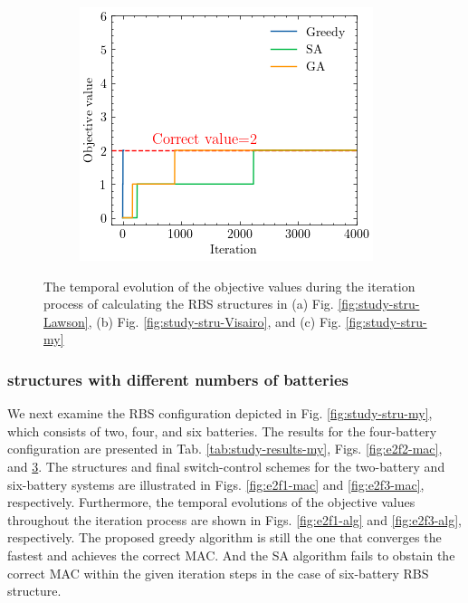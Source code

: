 \documentclass{article}
\begin{document}
\begin{figure}[htbp]
\begin{subfigure}[b]{0.32\textwidth}
        \caption{}
        \label{fig:f4-alg}
    \end{subfigure}
    \begin{subfigure}[b]{0.32\textwidth}
        \includegraphics[width=\textwidth]{e2f2-alg}
        \caption{}
        \label{fig:e2f2-alg}
    \end{subfigure}
    \caption{The temporal evolution of the objective values during the iteration process of calculating the RBS structures in (a) Fig. \ref{fig:study-stru-Lawson}, (b) Fig. \ref{fig:study-stru-Visairo}, and (c) Fig. \ref{fig:study-stru-my}}
\end{figure}

\subsubsection{structures with different numbers of batteries}

We next examine the RBS configuration depicted in Fig. \ref{fig:study-stru-my}, which consists of two, four, and six batteries.
The results for the four-battery configuration are presented in Tab. \ref{tab:study-results-my}, Figs. \ref{fig:e2f2-mac}, and \ref{fig:e2f2-alg}.
The structures and final switch-control schemes for the two-battery and six-battery systems are illustrated in Figs. \ref{fig:e2f1-mac} and \ref{fig:e2f3-mac}, respectively.
Furthermore, the temporal evolutions of the objective values throughout the iteration process are shown in Figs. \ref{fig:e2f1-alg} and \ref{fig:e2f3-alg}, respectively.
The proposed greedy algorithm is still the one that converges the fastest and achieves the correct MAC. 
And the SA algorithm fails to obstain the correct MAC within the given iteration steps in the case of six-battery RBS structure. 
\end{document}
